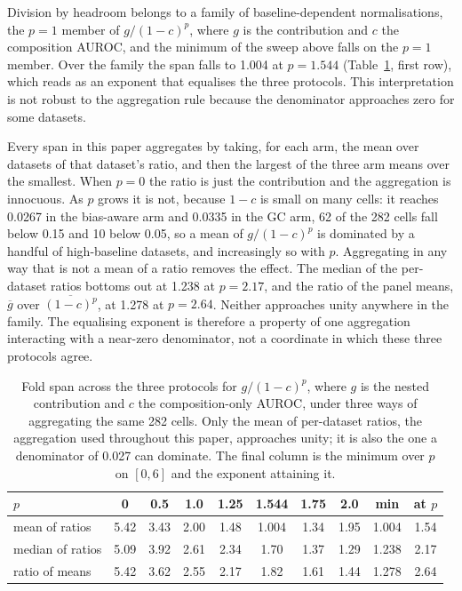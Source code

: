 Division by headroom belongs to a family of baseline-dependent normalisations, the $p=1$ member
of $g/(1-c)^{p}$, where $g$ is the contribution and $c$ the composition AUROC, and the minimum
of the sweep above falls on the $p=1$ member. Over the family the span falls to 1.004 at
$p=1.544$ (Table~\ref{tab:exponent}, first row), which reads as an exponent that equalises the
three protocols. This interpretation is not robust to the aggregation rule because the
denominator approaches zero for some datasets.

Every span in this paper aggregates by taking, for each arm, the mean over datasets of that
dataset's ratio, and then the largest of the three arm means over the smallest. When $p=0$ the
ratio is just the contribution and the aggregation is innocuous. As $p$ grows it is not, because
$1-c$ is small on many cells: it reaches 0.0267 in the bias-aware arm and 0.0335 in the GC arm,
62 of the 282 cells fall below 0.15 and 10 below 0.05, so a mean of $g/(1-c)^{p}$ is dominated
by a handful of high-baseline datasets, and increasingly so with $p$. Aggregating in any way
that is not a mean of a ratio removes the effect. The median of the per-dataset ratios bottoms
out at 1.238 at $p=2.17$, and the ratio of the panel means, $\overline{g}$ over
$\overline{(1-c)^{p}}$, at 1.278 at $p=2.64$. Neither approaches unity anywhere in the family.
The equalising exponent is therefore a property of one aggregation interacting with a near-zero
denominator, not a coordinate in which these three protocols agree.

\begin{table}[htbp]
\centering
\caption{Fold span across the three protocols for $g/(1-c)^{p}$, where $g$ is the nested
contribution and $c$ the composition-only AUROC, under three ways of aggregating the same 282
cells. Only the mean of per-dataset ratios, the aggregation used throughout this paper,
approaches unity; it is also the one a denominator of 0.027 can dominate. The final column is
the minimum over $p$ on $[0, 6]$ and the exponent attaining it.}
\label{tab:exponent}
\begin{tabular}{lccccccccc}
\toprule
$p$ & 0 & 0.5 & 1.0 & 1.25 & 1.544 & 1.75 & 2.0 & min & at $p$ \\
\midrule
mean of ratios    & 5.42 & 3.43 & 2.00 & 1.48 & 1.004 & 1.34 & 1.95 & 1.004 & 1.54 \\
median of ratios  & 5.09 & 3.92 & 2.61 & 2.34 & 1.70 & 1.37 & 1.29 & 1.238 & 2.17 \\
ratio of means    & 5.42 & 3.62 & 2.55 & 2.17 & 1.82 & 1.61 & 1.44 & 1.278 & 2.64 \\
\bottomrule
\end{tabular}
\end{table}

